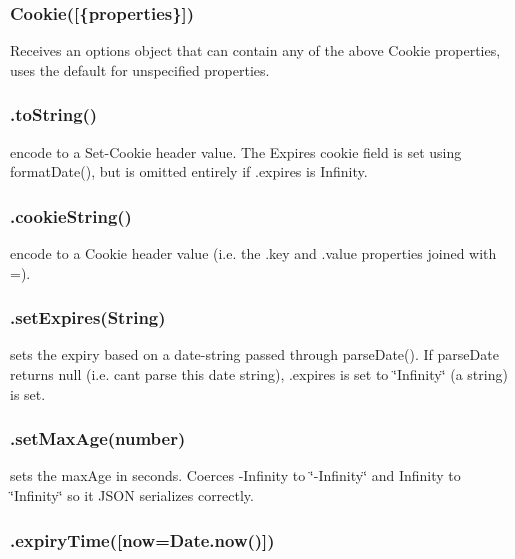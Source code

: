 \subsubsection*{{\ttfamily Cookie(\mbox{[}\{properties\}\mbox{]})}}

Receives an options object that can contain any of the above Cookie properties, uses the default for unspecified properties.

\subsubsection*{{\ttfamily .to\+String()}}

encode to a Set-\/\+Cookie header value. The Expires cookie field is set using {\ttfamily format\+Date()}, but is omitted entirely if {\ttfamily .expires} is {\ttfamily Infinity}.

\subsubsection*{{\ttfamily .cookie\+String()}}

encode to a Cookie header value (i.\+e. the {\ttfamily .key} and {\ttfamily .value} properties joined with \textquotesingle{}=\textquotesingle{}).

\subsubsection*{{\ttfamily .set\+Expires(\+String)}}

sets the expiry based on a date-\/string passed through {\ttfamily parse\+Date()}. If parse\+Date returns {\ttfamily null} (i.\+e. can\textquotesingle{}t parse this date string), {\ttfamily .expires} is set to {\ttfamily \char`\"{}\+Infinity\char`\"{}} (a string) is set.

\subsubsection*{{\ttfamily .set\+Max\+Age(number)}}

sets the max\+Age in seconds. Coerces {\ttfamily -\/\+Infinity} to {\ttfamily \char`\"{}-\/\+Infinity\char`\"{}} and {\ttfamily Infinity} to {\ttfamily \char`\"{}\+Infinity\char`\"{}} so it J\+S\+ON serializes correctly.

\subsubsection*{{\ttfamily .expiry\+Time(\mbox{[}now=Date.\+now()\mbox{]})}}


